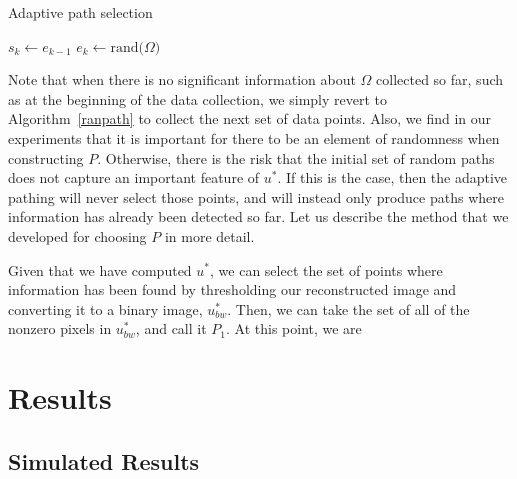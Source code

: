 \documentclass[english]{article}\usepackage[]{graphicx}\usepackage[]{color}
\begin{document}
\begin{algorithm}[H]
\caption{Adaptive path selection}\label{adaptivepath}
\begin{algorithmic}[1]
\State $s_k\gets e_{k-1}$
\State $e_k\gets \text{rand(}\Omega)$
\EndFor
\EndProcedure
\end{algorithmic}
\end{algorithm}

Note that when there is no significant information about $\Omega$ collected so far, such as at the beginning of the data collection, 
we simply revert to Algorithm~\ref{ranpath} to collect the next set of data points. Also, we find in our experiments that it is 
important for there to be an element of randomness when constructing $P$. Otherwise, there is the risk that the initial set of random 
paths does not capture an important feature of $u^*$. If this is the case, then the adaptive pathing will never select those points, and will instead only produce paths where information has already been detected so far. Let us describe the method that we developed  
for choosing $P$ in more detail.

Given that we have computed $u^*$, we can select the set of points where information has been found by thresholding our reconstructed image and converting it to a binary image, $u^*_{bw}$. Then, we 
can take the set of all of the nonzero pixels in $u^*_{bw}$, and call it $P_1$. At this point, we are 



\section{Results}
\subsection{Simulated Results}
\end{document}

